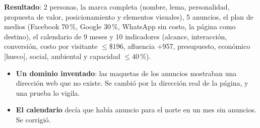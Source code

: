 \textbf{Resultado}: 2 personas, la marca completa (nombre, lema, personalidad, propuesta de valor, posicionamiento y elementos
visuales), 5 anuncios, el plan de medios (Facebook 70\,\%, Google 30\,\%, WhatsApp sin costo, la página como destino), el
calendario de 9 meses y 10 indicadores (alcance, interacción, conversión, costo por visitante $\le\$196$, afluencia +957,
presupuesto, económico [hueco], social, ambiental y capacidad $\le40\,\%$).

\begin{error}
\begin{itemize}
\item \textbf{Un dominio inventado}: las maquetas de los anuncios mostraban una dirección web que no existe. Se cambió por la
  dirección real de la página, y una prueba lo vigila.
\item \textbf{El calendario} decía que había anuncio para el norte en un mes sin anuncios. Se corrigió.
\end{itemize}
\end{error}

